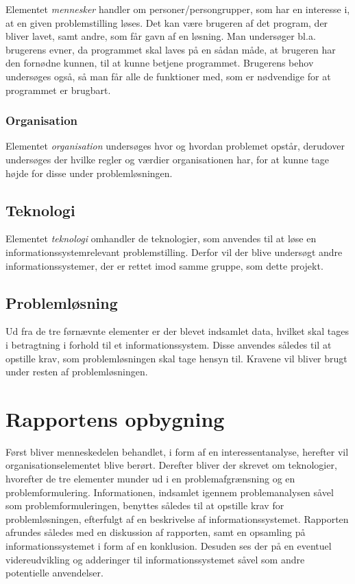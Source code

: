 Elementet \textit{mennesker} handler om personer/persongrupper, som har en interesse i, at en given problemstilling løses. 
Det kan være brugeren af det program, der bliver lavet, samt andre, som får gavn af en løsning.
Man undersøger bl.a. brugerens evner, da programmet skal laves på en sådan måde, at brugeren har den fornødne kunnen, til at kunne betjene programmet.
Brugerens behov undersøges også, så man får alle de funktioner med, som er nødvendige for at programmet er brugbart.


\subsubsection{Organisation}\label{subsec:organisation}

Elementet \textit{organisation} undersøges hvor og hvordan problemet opstår, derudover undersøges der hvilke regler og værdier organisationen har, for at kunne tage højde for disse under problemløsningen. 


\subsection{Teknologi}\label{subsec:Teknologi}

Elementet \textit{teknologi} omhandler de teknologier, som anvendes til at løse en informationssystemrelevant problemstilling.
Derfor vil der blive undersøgt andre informationssystemer, der er rettet imod samme gruppe, som dette projekt.


\subsection{Problemløsning}
Ud fra de tre førnævnte elementer er der blevet indsamlet data, hvilket skal tages i betragtning i forhold til et informationssystem.
Disse anvendes således til at opstille krav, som problemløsningen skal tage hensyn til.
Kravene vil bliver brugt under resten af problemløsningen.


\section{Rapportens opbygning}\label{sec:rapportens-opbygning}

Først bliver menneskedelen behandlet, i form af en interessentanalyse, herefter vil organisationselementet blive berørt.
Derefter bliver der skrevet om teknologier, hvorefter de tre elementer munder ud i en problemafgrænsning og en problemformulering.
Informationen, indsamlet igennem problemanalysen såvel som problemformuleringen, benyttes således til at opstille krav for problemløsningen, efterfulgt af en beskrivelse af informationssystemet. 
Rapporten afrundes således med en diskussion af rapporten, samt en opsamling på informationssystemet i form af en konklusion. Desuden ses der på en eventuel videreudvikling og adderinger til informationssystemet såvel som andre potentielle anvendelser.
